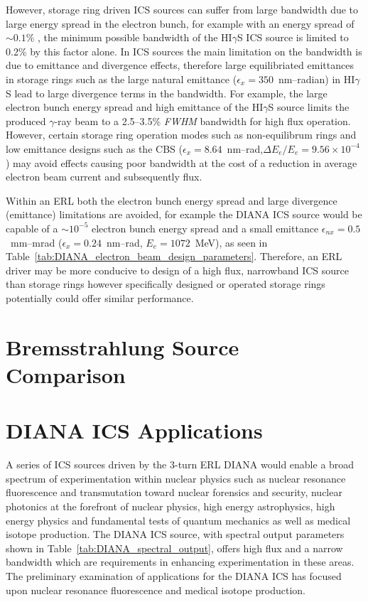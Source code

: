\documentclass[../main.tex]{subfiles}
\begin{document}
However, storage ring driven ICS sources can suffer from large bandwidth due to large energy spread in the electron bunch, for example with an energy spread of $\sim0.1$\% \cite{litvinenko1996intense}, the minimum possible bandwidth of the HI$\gamma$S ICS source is limited to 0.2\% by this factor alone. In ICS sources the main limitation on the bandwidth is due to emittance and divergence effects, therefore large equilibriated emittances in storage rings such as the large natural emittance ($\epsilon_{x} = 350$~\si{\nano\meter}--\si{radian}) in HI$\gamma$S \cite{weller2009research} lead to large divergence terms in the bandwidth. For example, the large electron bunch energy spread and high emittance of the HI$\gamma$S source limits the produced $\gamma$-ray beam to a 2.5--3.5\% \textit{FWHM} bandwidth \cite{weller2009research} for high flux operation. However, certain storage ring operation modes such as non-equilibrum rings \cite{huang1998laser,owen2013nonequilibrium} and low emittance designs such as the CBS \cite{pan2019design} ($\epsilon_{x} = 8.64$~\si{\nano\meter}--\si{\radian},$\Delta E_{e}/E_{e} = 9.56\times 10^{-4}$) may avoid effects causing poor bandwidth at the cost of a reduction in average electron beam current and subsequently flux.     

Within an ERL both the electron bunch energy spread and large divergence (emittance) limitations are avoided, for example the DIANA ICS source would be capable of a $\sim10^{-5}$ electron bunch energy spread and a small emittance $\epsilon_{nx} = 0.5$~\si{\milli\meter}--\si{\milli\radian} ($\epsilon_{x} = 0.24$~\si{\nano\meter}--\si{\radian}, $E_{e} = 1072$~\si{\mega\electronvolt}), as seen in Table~\ref{tab:DIANA_electron_beam_design_parameters}. Therefore, an ERL driver may be more conducive to design of a high flux, narrowband ICS source than storage rings however specifically designed or operated storage rings potentially could offer similar performance.

\section{Bremsstrahlung Source Comparison}

\section{DIANA ICS Applications}

A series of ICS sources driven by the 3-turn ERL DIANA would enable a broad spectrum of experimentation within nuclear physics such as nuclear resonance fluorescence and transmutation toward nuclear forensics and security, nuclear photonics at the forefront of nuclear physics, high energy astrophysics, high energy physics and fundamental tests of quantum mechanics as well as medical isotope production. The DIANA ICS source, with spectral output parameters shown in Table~\ref{tab:DIANA_spectral_output}, offers high flux and a narrow bandwidth which are requirements in enhancing experimentation in these areas. The preliminary examination of applications for the DIANA ICS has focused upon nuclear resonance fluorescence and medical isotope production.  
\end{document}
